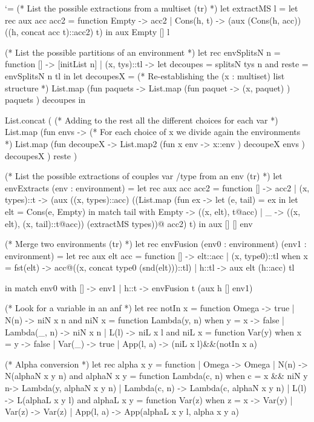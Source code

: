 \documentclass{article}
\let\origlstlisting=\lstlisting
\let\endoriglstlisting=\endlstlisting
\renewenvironment{lstlisting}
{\mathcode`\-=\hyphenmathcode
    \everymath{}\mathsurround=0pt\origlstlisting}
{\endoriglstlisting}
\begin{document}
\begin{lstlisting}
(* List the possible extractions from a multiset (tr) *)
let extractMS l =
  let rec aux acc acc2 = function
  Empty -> acc2
  | Cons(h, t) -> (aux (Cons(h, acc)) ((h, concat acc t)::acc2) t) in
  aux Empty [] l

(* List the possible partitions of an environment *)
let rec envSplitsN n = function
  [] -> [initList n]
  | (x, tys)::tl -> let decoupes = splitsN tys n 
                       and reste = envSplitsN n tl in
    let decoupesX = 
      (* Re-establishing the (x : multiset) list structure *)
      List.map (fun paquets -> 
        List.map (fun paquet -> 
            (x, paquet)
        ) paquets
      ) decoupes in
            
    List.concat (
      (* Adding to the rest all the different choices for each var *)
      List.map (fun envs -> 
        (* For each choice of x we divide again the environments *)
        List.map (fun decoupeX -> 
          List.map2 (fun x env -> 
            x::env
          ) decoupeX envs
        ) decoupesX
      ) reste
    )

(* List the possible extractions of couples var /type from an env (tr) *)
let envExtracts (env : environment) = 
  let rec aux acc acc2 = function
    [] -> acc2
  | (x, types)::t -> (aux ((x, types)::acc) ((List.map (fun ex -> let (e, tail) = ex in 
		let elt = Cons(e, Empty) in 
		 match tail with
		   Empty -> ((x, elt), t@acc)
		 | _ -> ((x, elt), (x, tail)::t@acc)) (extractMS types))@ acc2) t) in
  aux [] [] env

(* Merge two environments (tr) *)
let rec envFusion (env0 : environment) (env1 : environment) = 
  let rec aux elt acc = function 
      [] -> elt::acc
    | (x, type0)::tl when x = fst(elt) -> acc@((x, concat type0 (snd(elt)))::tl)
    | h::tl -> aux elt (h::acc) tl

  in match env0 with
    [] -> env1
  | h::t -> envFusion t (aux h [] env1)


(* Look for a variable in an anf *)
let rec notIn x = function
    Omega -> true
  | N(n) -> niN x n
and niN x = function
    Lambda(y, n) when y = x -> false
  | Lambda(_, n) -> niN x n
  | L(l) -> niL x l
and niL x = function
    Var(y) when x = y -> false
  | Var(_) -> true
  | App(l, a) -> (niL x l)&&(notIn x a)

(* Alpha conversion *)
let rec alpha x y = function
  | Omega -> Omega
  | N(n) -> N(alphaN x y n)
and alphaN x y = function
    Lambda(c, n) when c = x && niN y n-> Lambda(y, alphaN x y n)
  | Lambda(c, n) -> Lambda(c, alphaN x y n)
  | L(l) -> L(alphaL x y l)
and alphaL x y = function
    Var(z) when z = x -> Var(y)
  | Var(z) -> Var(z)
  | App(l, a) -> App(alphaL x y l, alpha x y a)


\end{lstlisting}
\end{document}
